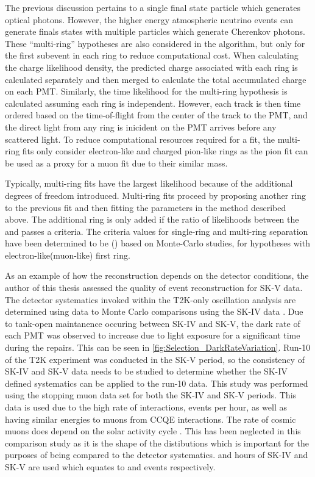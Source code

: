 The previous discussion pertains to a single final state particle which generates optical photons. However, the higher energy atmospheric neutrino events can generate finals states with multiple particles which generate Cherenkov photons. These ``multi-ring'' hypotheses are also considered in the \fq algorithm, but only for the first subevent in each ring to reduce computational cost. When calculating the charge likelihood density, the predicted charge associated with each ring is calculated separately and then merged to calculate the total accumulated charge on each PMT. Similarly, the time likelihood for the multi-ring hypothesis is calculated assuming each ring is independent. However, each track is then time ordered based on the time-of-flight from the center of the track to the PMT, and the direct light from any ring is inicident on the PMT arrives before any scattered light. To reduce computational resources required for a fit, the multi-ring fits only consider electron-like and charged pion-like rings as the pion fit can be used as a proxy for a muon fit due to their similar mass.

Typically, multi-ring fits have the largest likelihood because of the additional degrees of freedom introduced. Multi-ring fits proceed by proposing another ring to the previous fit and then fitting the parameters in the method described above. The additional ring is only added if the ratio of likelihoods between the  and  passes a criteria. The criteria values for single-ring and multi-ring separation have been determined to be () based on Monte-Carlo studies, for hypotheses with electron-like(muon-like) first ring.

As an example of how the reconstruction depends on the detector conditions, the author of this thesis assessed the quality of event reconstruction for SK-V data. The detector systematics invoked within the T2K-only oscillation analysis are determined using data to Monte Carlo comparisons using the SK-IV data \cite{t2k_tn_326}. Due to tank-open maintanence occuring between SK-IV and SK-V, the dark rate of each PMT was observed to increase due to light exposure for a significant time during the repairs. This can be seen in \autoref{fig:Selection_DarkRateVariation}. Run-10 of the T2K experiment was conducted in the SK-V period, so the consistency of SK-IV and SK-V data needs to be studied to determine whether the SK-IV defined systematics can be applied to the run-10 data. This study was performed using the stopping muon data set for both the SK-IV and SK-V periods. This data is used due to the high rate of interactions,  events per hour, as well as having similar energies to muons from CCQE \quickmath{\nu_{\mu}} interactions. The rate of cosmic muons does depend on the solar activity cycle \cite{Maghrabi2021}. This has been neglected in this comparison study as it is the shape of the distibutions which is important for the purposes of being compared to the detector systematics.  and  hours of SK-IV and SK-V are used which equates to  and  events respectively.

